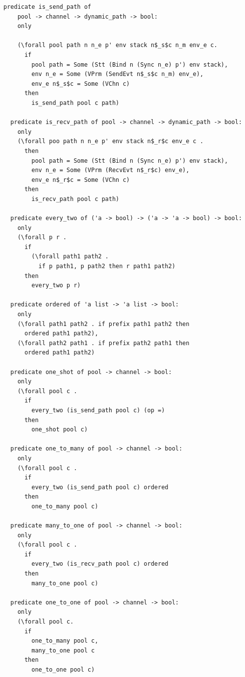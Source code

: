 \documentclass[10pt]{article}
\begin{document}
\begin{lstlisting}[language=logic, mathescape]
  predicate is_send_path of
    pool -> channel -> dynamic_path -> bool:
    only

    (\forall pool path n n_e p' env stack n$_s$c n_m env_e c.
      if
        pool path = Some (Stt (Bind n (Sync n_e) p') env stack),
        env n_e = Some (VPrm (SendEvt n$_s$c n_m) env_e), 
        env_e n$_s$c = Some (VChn c)
      then
        is_send_path pool c path)

  predicate is_recv_path of pool -> channel -> dynamic_path -> bool:
    only
    (\forall poo path n n_e p' env stack n$_r$c env_e c .
      then
        pool path = Some (Stt (Bind n (Sync n_e) p') env stack),
        env n_e = Some (VPrm (RecvEvt n$_r$c) env_e),
        env_e n$_r$c = Some (VChn c)
      then
        is_recv_path pool c path)

  predicate every_two of ('a -> bool) -> ('a -> 'a -> bool) -> bool:
    only
    (\forall p r .
      if
        (\forall path1 path2 .
          if p path1, p path2 then r path1 path2)
      then
        every_two p r)

  predicate ordered of 'a list -> 'a list -> bool:
    only
    (\forall path1 path2 . if prefix path1 path2 then
      ordered path1 path2),
    (\forall path2 path1 . if prefix path2 path1 then
      ordered path1 path2)

  predicate one_shot of pool -> channel -> bool:
    only
    (\forall pool c .
      if
        every_two (is_send_path pool c) (op =)
      then
        one_shot pool c)

  predicate one_to_many of pool -> channel -> bool:
    only
    (\forall pool c .
      if
        every_two (is_send_path pool c) ordered
      then
        one_to_many pool c)

  predicate many_to_one of pool -> channel -> bool:
    only
    (\forall pool c .
      if
        every_two (is_recv_path pool c) ordered
      then
        many_to_one pool c)

  predicate one_to_one of pool -> channel -> bool:
    only
    (\forall pool c.
      if
        one_to_many pool c,
        many_to_one pool c
      then
        one_to_one pool c)
  \end{lstlisting}
\end{document}
